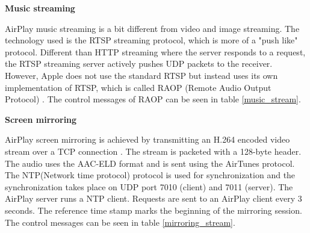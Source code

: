 \textbf{Music streaming}

AirPlay music streaming is a bit different from video and image streaming. The 
technology used is the RTSP streaming protocol, which is more of a "push like"
protocol. Different than HTTP streaming where the server responds to a request,
the RTSP streaming server actively pushes UDP packets to the receiver. However,
Apple does not use the standard RTSP but instead uses its own implementation of
RTSP, which is called RAOP (Remote Audio Output Protocol) \cite{AirPlay-spec}.
The control messages of RAOP can be seen in table \ref{music_stream}.

\begin{table}[htb] 
\caption{AirPlay Audio Control RTSP requests \label{music_stream}} 
\begin{center} 
\end{center} 
\end{table} 

\textbf{Screen mirroring}

AirPlay screen mirroring is achieved by transmitting an H.264 encoded video stream 
over a TCP connection \cite{AirPlay-spec}. The stream is packeted with a
128-byte header. The audio uses the AAC-ELD format and is sent using the AirTunes protocol. 
The NTP(Network time protocol) protocol is used for synchronization and the synchronization 
takes place on UDP port 7010 (client) and 7011 (server). The 
AirPlay server runs a NTP client. Requests are sent to an AirPlay client every 3 
seconds. The reference time stamp marks the beginning of the 
mirroring session. The control messages can be seen in table 
\ref{mirroring_stream}.

\begin{table}[htb] 
\caption{AirPlay Mirroring Control HTTP requests \label{mirroring_stream}} 
\begin{center} 
\end{center} 
\end{table} 

